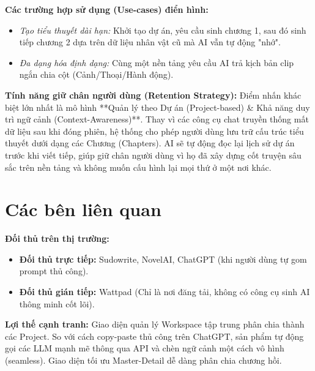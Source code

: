 \documentclass[final]{hcmuitthesis}
\begin{document}
\textbf{Các trường hợp sử dụng (Use-cases) điển hình:}
\begin{itemize}
    \item \textit{Tạo tiểu thuyết dài hạn:} Khởi tạo dự án, yêu cầu sinh chương 1, sau đó sinh tiếp chương 2 dựa trên dữ liệu nhân vật cũ mà AI vẫn tự động "nhớ".
    \item \textit{Đa dạng hóa định dạng:} Cùng một nền tảng yêu cầu AI trả kịch bản clip ngắn chia cột (Cảnh/Thoại/Hành động).
\end{itemize}

\textbf{Tính năng giữ chân người dùng (Retention Strategy):}
Điểm nhấn khác biệt lớn nhất là mô hình **Quản lý theo Dự án (Project-based) \& Khả năng duy trì ngữ cảnh (Context-Awareness)**. Thay vì các công cụ chat truyền thống mất dữ liệu sau khi đóng phiên, hệ thống cho phép người dùng lưu trữ cấu trúc tiểu thuyết dưới dạng các Chương (Chapters). AI sẽ tự động đọc lại lịch sử dự án trước khi viết tiếp, giúp giữ chân người dùng vì họ đã xây dựng cốt truyện sâu sắc trên nền tảng và không muốn cấu hình lại mọi thứ ở một nơi khác.

\section{Các bên liên quan}
\textbf{Đối thủ trên thị trường:}
\begin{itemize}
    \item \textbf{Đối thủ trực tiếp:} Sudowrite, NovelAI, ChatGPT (khi người dùng tự gom prompt thủ công).
    \item \textbf{Đối thủ gián tiếp:} Wattpad (Chỉ là nơi đăng tải, không có công cụ sinh AI thông minh cốt lõi).
\end{itemize}

\textbf{Lợi thế cạnh tranh:}
Giao diện quản lý Workspace tập trung phân chia thành các Project. So với cách copy-paste thủ công trên ChatGPT, sản phẩm tự động gọi các LLM mạnh mẽ thông qua API và chèn ngữ cảnh một cách vô hình (seamless). Giao diện tối ưu Master-Detail dễ dàng phân chia chương hồi.
\end{document}
